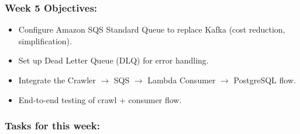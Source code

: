 \hypertarget{week-5-objectives}{%
\subsubsection{Week 5 Objectives:}}

\begin{itemize}
\tightlist
\item
  Configure Amazon SQS Standard Queue to replace Kafka (cost reduction,
  simplification).
\item
  Set up Dead Letter Queue (DLQ) for error handling.
\item
  Integrate the Crawler \(\rightarrow\) SQS \(\rightarrow\) Lambda
  Consumer \(\rightarrow\) PostgreSQL flow.
\item
  End-to-end testing of crawl + consumer flow.
\end{itemize}

\hypertarget{tasks-for-this-week}{%
\subsubsection{Tasks for this week:}}

